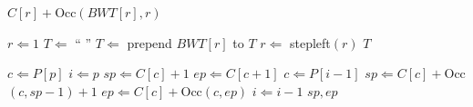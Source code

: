 \documentclass{article}
\begin{document}
\newcommand{\stepleft}{\ensuremath{\mbox{\sc stepleft}}}
\newcommand{\unpermute}{\ensuremath{\mbox{\sc unpermute}}}
\newcommand{\exactmatch}{\ensuremath{\mbox{\sc exactmatch}}}

\begin{algorithm}[stepleft]
\caption{$\stepleft(r)$}\label{alg:stepleft} 
\begin{algorithmic}[1] 
\RETURN $C[r] + $Occ$(BWT[r], r)$
\end{algorithmic} 
\end{algorithm} 

\begin{algorithm}[unpermute]
\caption{$\unpermute$}\label{alg:unpermute} 
\begin{algorithmic}[1] 
\STATE $r \Leftarrow 1$
\STATE $T \Leftarrow $ `` ''
\STATE $T \Leftarrow $ prepend $BWT[r]$ to $T$
\STATE $r \Leftarrow $ {\sc stepleft}$(r)$
\ENDWHILE
\RETURN $T$
\end{algorithmic} 
\end{algorithm} 

\begin{algorithm}[exactmatch]
\caption{$\exactmatch(P[1,p])$}\label{alg:exactmatch} 
\begin{algorithmic}[1] 
\STATE $c \Leftarrow P[p]$
\STATE $i \Leftarrow p$
\STATE $sp \Leftarrow C[c]+1$
\STATE $ep \Leftarrow C[c+1]$
\STATE $c \Leftarrow P[i-1]$
\STATE $sp \Leftarrow C[c] + $Occ$(c, sp-1) + 1$
\STATE $ep \Leftarrow C[c] + $Occ$(c, ep)$
\STATE $i \Leftarrow i-1$
\ENDWHILE
\RETURN $sp, ep$
\end{algorithmic} 
\end{algorithm} 
\end{document}
